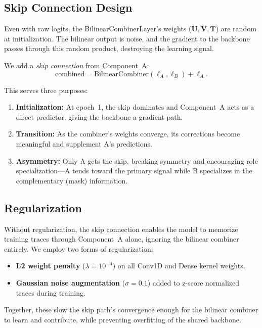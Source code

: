 \documentclass[submission]{iacrtrans}
\begin{document}
\subsection{Skip Connection Design}\label{sec:skip}

Even with raw logits, the BilinearCombinerLayer's weights ($\bm{U}, \bm{V}, \bm{T}$) are random at initialization. The bilinear output is noise, and the gradient to the backbone passes through this random product, destroying the learning signal.

We add a \emph{skip connection} from Component~A:
\begin{equation}\label{eq:skip}
  \text{combined} = \text{BilinearCombiner}(\bm{\ell}_A, \bm{\ell}_B) + \bm{\ell}_A.
\end{equation}

This serves three purposes:
\begin{enumerate}[leftmargin=*]
  \item \textbf{Initialization:} At epoch~1, the skip dominates and Component~A acts as a direct predictor, giving the backbone a gradient path.
  \item \textbf{Transition:} As the combiner's weights converge, its corrections become meaningful and supplement A's predictions.
  \item \textbf{Asymmetry:} Only A gets the skip, breaking symmetry and encouraging role specialization---A tends toward the primary signal while B specializes in the complementary (mask) information.
\end{enumerate}

\subsection{Regularization}\label{sec:regularization}

Without regularization, the skip connection enables the model to memorize training traces through Component~A alone, ignoring the bilinear combiner entirely. We employ two forms of regularization:
\begin{itemize}[leftmargin=*]
  \item \textbf{L2 weight penalty} ($\lambda = 10^{-4}$) on all Conv1D and Dense kernel weights.
  \item \textbf{Gaussian noise augmentation} ($\sigma = 0.1$) added to z-score normalized traces during training.
\end{itemize}
Together, these slow the skip path's convergence enough for the bilinear combiner to learn and contribute, while preventing overfitting of the shared backbone.
\end{document}
